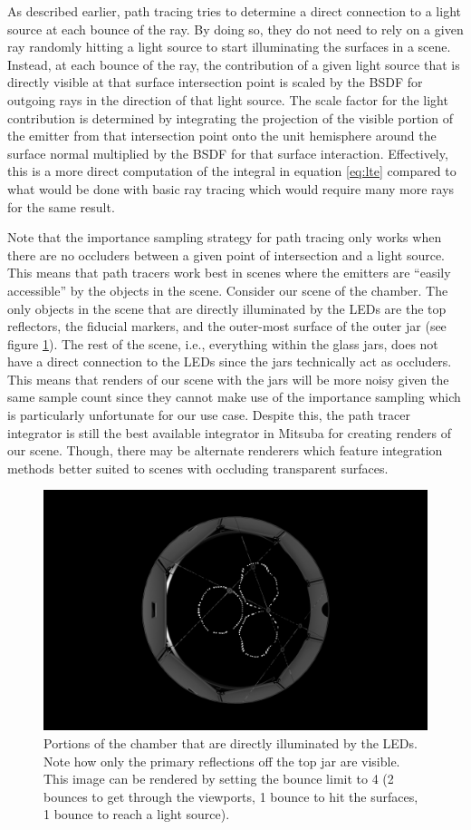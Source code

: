 \documentclass[11pt, letterpaper]{extarticle} %
\begin{document}
As described earlier, path tracing tries to determine a direct connection to a light source at each bounce of the ray. By doing so, they do not need to rely on a given ray randomly hitting a light source to start illuminating the surfaces in a scene. Instead, at each bounce of the ray, the contribution of a given light source that is directly visible at that surface intersection point is scaled by the BSDF for outgoing rays in the direction of that light source. The scale factor for the light contribution is determined by integrating the projection of the visible portion of the emitter from that intersection point onto the unit hemisphere around the surface normal multiplied by the BSDF for that surface interaction. Effectively, this is a more direct computation of the integral in equation \ref{eq:lte} compared to what would be done with basic ray tracing which would require many more rays for the same result.

Note that the importance sampling strategy for path tracing only works when there are no occluders between a given point of intersection and a light source. This means that path tracers work best in scenes where the emitters are ``easily accessible'' by the objects in the scene. Consider our scene of the chamber. The only objects in the scene that are directly illuminated by the LEDs are the top reflectors, the fiducial markers, and the outer-most surface of the outer jar (see figure \ref{fig:direct_illumination_components}). The rest of the scene, i.e., everything within the glass jars, does not have a direct connection to the LEDs since the jars technically act as occluders. This means that renders of our scene with the jars will be more noisy given the same sample count since they cannot make use of the importance sampling which is particularly unfortunate for our use case. Despite this, the path tracer integrator is still the best available integrator in Mitsuba for creating renders of our scene. Though, there may be alternate renderers which feature integration methods better suited to scenes with occluding transparent surfaces.

\begin{figure}[h]
    \centering
    \includegraphics[width=0.5\linewidth]{direct_illumination.png}
    \caption{Portions of the chamber that are directly illuminated by the LEDs. Note how only the primary reflections off the top jar are visible. This image can be rendered by setting the bounce limit to 4 (2 bounces to get through the viewports, 1 bounce to hit the surfaces, 1 bounce to reach a light source).}
    \label{fig:direct_illumination_components}
\end{figure}
\end{document}
